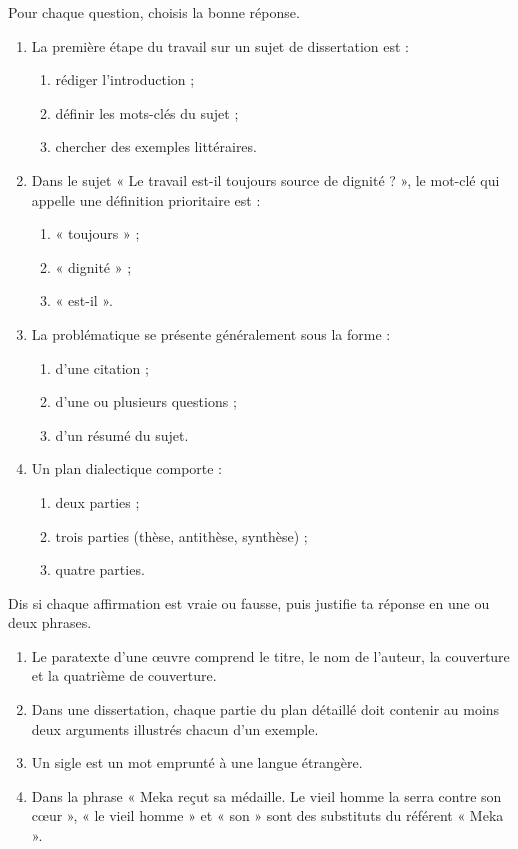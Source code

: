 \documentclass[11pt]{article}
\begin{document}
\begin{exercice}
Pour chaque question, choisis la bonne réponse.
\begin{enumerate}
\item La première étape du travail sur un sujet de dissertation est :
\begin{enumerate}
\item[a)] rédiger l'introduction ;
\item[b)] définir les mots-clés du sujet ;
\item[c)] chercher des exemples littéraires.
\end{enumerate}
\item Dans le sujet « Le travail est-il toujours source de dignité ? », le mot-clé qui appelle une définition prioritaire est :
\begin{enumerate}
\item[a)] « toujours » ; \item[b)] « dignité » ; \item[c)] « est-il ».
\end{enumerate}
\item La problématique se présente généralement sous la forme :
\begin{enumerate}
\item[a)] d'une citation ; \item[b)] d'une ou plusieurs questions ; \item[c)] d'un résumé du sujet.
\end{enumerate}
\item Un plan dialectique comporte :
\begin{enumerate}
\item[a)] deux parties ; \item[b)] trois parties (thèse, antithèse, synthèse) ; \item[c)] quatre parties.
\end{enumerate}
\end{enumerate}
\end{exercice}

\begin{exercice}
Dis si chaque affirmation est vraie ou fausse, puis justifie ta réponse en une ou deux phrases.
\begin{enumerate}
\item Le paratexte d'une œuvre comprend le titre, le nom de l'auteur, la couverture et la quatrième de couverture.
\item Dans une dissertation, chaque partie du plan détaillé doit contenir au moins deux arguments illustrés chacun d'un exemple.
\item Un sigle est un mot emprunté à une langue étrangère.
\item Dans la phrase « Meka reçut sa médaille. Le vieil homme la serra contre son cœur », « le vieil homme » et « son » sont des substituts du référent « Meka ».
\end{enumerate}
\end{exercice}
\end{document}
